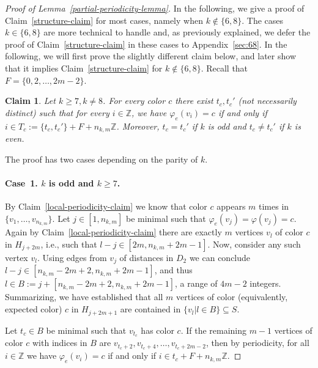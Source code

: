 \documentclass[a4paper,10pt,hidelinks]{amsart}
\newcommand{\Z}{\mathbb{Z}}
\renewcommand{\phi}{\ensuremath{\varphi}}
\newtheorem{claim}[theorem]{Claim}
\newenvironment{claimproof}[1][\proofname]{\proof[#1]\renewcommand{\qedsymbol}{$\blacksquare$}}{\endproof}
\theoremstyle{definition}
\begin{document}
\begin{proof}[Proof of Lemma~\ref{partial-periodicity-lemma}]
    In the following, we give a proof of Claim~\ref{structure-claim} for most cases, namely when $k\notin \{6,8\}$. The cases $k\in \{6,8\}$ are more technical to handle and, as previously explained, we defer the proof of Claim~\ref{structure-claim} in these cases to Appendix~\ref{sec:68}. In the following, we will first prove the slightly different claim below, and later show that it implies Claim~\ref{structure-claim} for $k\notin \{6,8\}$. Recall that $F=\{0,2,\ldots,2m-2\}$.
    \begin{claim}\label{equiv-structure}
        Let $k\ge 7, k\neq 8$. For every color $c$ there exist $t_c, t_c'$ (not necessarily distinct) such that for every $i\in \mathbb{Z}$, we have $\varphi_e(v_i) = c$ if and only if $i \in T_c :=\{t_c, t_c'\} + F + n_{k,m}\Z$. Moreover, $t_c=t_c'$ if $k$ is odd and $t_c\neq t_c'$ if $k$ is even.
    \end{claim}
        
    \begin{claimproof}[Proof of Claim~\ref{equiv-structure}]
        The proof has two cases depending on the parity of $k$.

        \medskip
        
        \paragraph*{\textbf{Case~1.} $k$ is odd and $k \geq 7$.} By Claim~\ref{local-periodicity-claim} we know that color $c$ appears $m$ times in $\{v_1,\ldots,v_{n_{k,m}}\}$. Let $j\in [1,n_{k,m}]$ be minimal such that $\phi_e(v_j)=\phi(v_j)=c$. 
        Again by Claim~\ref{local-periodicity-claim} there are exactly $m$ vertices $v_l$ of color $c$ in $H_{j+2m}$, i.e.,  such that $l - j \in [2m, n_{k, m} + 2m-1]$. Now, consider any such vertex $v_l$. Using edges from $v_j$ of distances in $D_2$ we can conclude $l-j \in [n_{k, m} - 2m + 2, n_{k, m} + 2m-1]$, and thus $l\in B:=j+[n_{k, m} - 2m + 2, n_{k, m} + 2m-1]$, a range of $4m - 2$ integers. Summarizing, we have established that all $m$ vertices of color (equivalently, expected color) $c$ in $H_{j+2m+1}$ are contained in $\{v_l|l\in B\}\subseteq S$. 
        
        Let $t_c \in B$ be minimal such that $v_{t_c}$ has color $c$. If the remaining $m-1$ vertices of color $c$ with indices in $B$ are $v_{t_c+2}, v_{t_c+4}, \dots, v_{t_c+2m - 2}$, then by periodicity, for all $i\in \mathbb{Z}$ we have $\varphi_e(v_i) = c$ if and only if $i \in t_c + F + n_{k,m}\mathbb{Z}$. 
        

\end{claimproof}
\end{proof}
\end{document}
